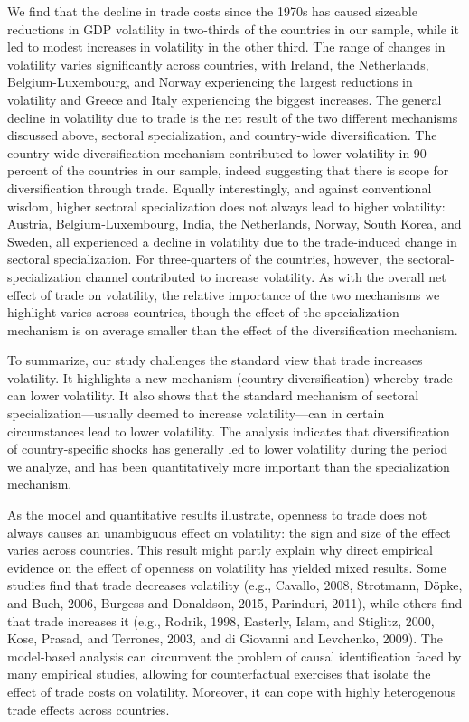 \documentclass[12pt]{article}
\begin{document}
We find that the decline in trade costs since the 1970s has caused sizeable
reductions in GDP volatility in two-thirds of the countries in our sample,
while it led to modest increases in volatility in the other third. The range
of changes in volatility varies significantly across countries, with
Ireland, the Netherlands, Belgium-Luxembourg, and Norway experiencing the
largest reductions in volatility and Greece and Italy experiencing the
biggest increases. The general decline in volatility due to trade is the net
result of the two different mechanisms discussed above, sectoral
specialization, and country-wide diversification. The country-wide
diversification mechanism contributed to lower volatility in 90 percent of
the countries in our sample, indeed suggesting that there is scope for
diversification through trade. Equally interestingly, and against
conventional wisdom, higher sectoral specialization does not always lead to
higher volatility: Austria, Belgium-Luxembourg, India, the Netherlands,
Norway, South Korea, and Sweden, all experienced a decline in volatility due
to the trade-induced change in sectoral specialization. For three-quarters
of the countries, however, the sectoral-specialization channel contributed
to increase volatility. As with the overall net effect of trade on
volatility, the relative importance of the two mechanisms we highlight
varies across countries, though the effect of the specialization mechanism
is on average smaller than the effect of the diversification mechanism.

To summarize, our study challenges the standard view that trade increases
volatility. It highlights a new mechanism (country diversification) whereby
trade can lower volatility. It also shows that the standard mechanism of
sectoral specialization---usually deemed to increase volatility---can in
certain circumstances lead to lower volatility. The analysis indicates that
diversification of country-specific shocks has generally led to lower
volatility during the period we analyze, and has been quantitatively more
important than the specialization mechanism.

As the model and quantitative results illustrate, openness to trade does not
always causes an unambiguous effect on volatility: the sign and size of the
effect varies across countries. This result might partly explain why direct
empirical evidence on the effect of openness on volatility has yielded mixed
results. Some studies find that trade decreases volatility (e.g., Cavallo,
2008, Strotmann, D\"{o}pke, and Buch, 2006, Burgess and Donaldson, 2015,
Parinduri, 2011), while others find that trade increases it (e.g., Rodrik,
1998, Easterly, Islam, and Stiglitz, 2000, Kose, Prasad, and Terrones, 2003,
and di Giovanni and Levchenko, 2009). The model-based analysis can
circumvent the problem of causal identification faced by many empirical
studies, allowing for counterfactual exercises that isolate the effect of
trade costs on volatility. Moreover, it can cope with highly heterogenous
trade effects across countries.
\end{document}
